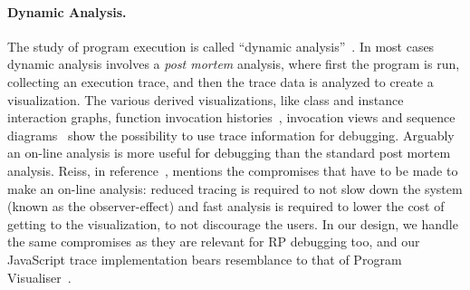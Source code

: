 \paragraph{Dynamic Analysis.}
The study of program execution is called ``dynamic analysis''~\cite{cornelissen2009systematic}.
In most cases dynamic analysis involves a \textit{post mortem} analysis, 
where first the program is run, collecting an execution trace, and then the trace data is analyzed to create a visualization.
The various derived visualizations, like class and instance interaction graphs, function invocation histories~\cite{lange1995program}, invocation views and sequence diagrams~\cite{cornelissen2008execution} show the possibility to use trace information for debugging.
Arguably an on-line analysis is more useful for debugging than the standard post mortem analysis. Reiss, in reference~\cite{reiss2006visualizing}, mentions the compromises that have to be made to make an on-line analysis:
reduced tracing is required to not slow down the system (known as the observer-effect) and
fast analysis is required to lower the cost of getting to the visualization, to not discourage the users.
In our design, we handle the same compromises as they are relevant for RP debugging too, and our JavaScript trace implementation bears resemblance to that of Program Visualiser~\cite{lange1995program}.




